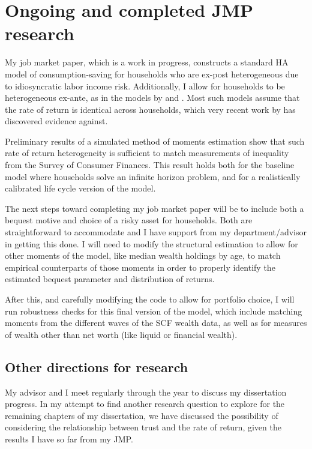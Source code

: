 \documentclass{scrartcl}
\begin{document}
%  

\section{Ongoing and completed JMP research}

My job market paper, which is a work in progress, constructs a standard HA model of consumption-saving for households who are ex-post heterogeneous due to idiosyncratic labor income risk. 
Additionally, I allow for households to be heterogeneous ex-ante, as in the models by \cite{gkgv22} and \cite{cstw2017}. 
Most such models assume that the rate of return is identical across households, which very recent work by \cite{aflgdmlp20} has discovered evidence against. 

Preliminary results of a simulated method of moments estimation show that such rate of return heterogeneity is sufficient to match measurements of inequality from the Survey of Consumer Finances. 
This result holds both for the baseline model where households solve an infinite horizon problem, and for a realistically calibrated
life cycle version of the model. 

The next steps toward completing my job market paper will be to include both a bequest motive and choice of a risky asset for households.
Both are straightforward to accommodate and I have support from my department/advisor in getting this done. 
I will need to modify the structural estimation to allow for other moments of the model, like median wealth holdings by age, to 
match empirical counterparts of those moments in order to properly identify the estimated bequest parameter and distribution of returns.

After this, and carefully modifying the code to allow for portfolio choice, I will run robustness checks for this final version of the model,
which include matching moments from the different waves of the SCF wealth data, as well as for measures of wealth other than net worth (like liquid or financial wealth).


\subsection{Other directions for research}

My advisor and I meet regularly through the year to discuss my dissertation progress. 
In my attempt to find another research question to explore for the remaining chapters of my dissertation,
we have discussed the possibility of considering the relationship between trust and the rate of return, given the results
I have so far from my JMP.
\end{document}
